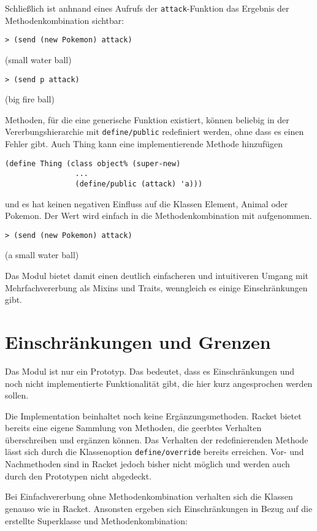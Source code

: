 Schließlich ist anhnand eines Aufrufs der \texttt{attack}-Funktion das Ergebnis der Methodenkombination sichtbar:

\begin{lstlisting}
> (send (new Pokemon) attack)
\end{lstlisting}
{\rsymbol (small water ball)}

\begin{lstlisting}
> (send p attack)
\end{lstlisting}
{\rsymbol (big fire ball)}

Methoden, für die eine generische Funktion existiert, können beliebig in der Vererbungshierarchie mit \texttt{define/public} redefiniert werden, ohne dass es einen Fehler gibt. Auch Thing kann eine implementierende Methode hinzufügen

\begin{lstlisting}
(define Thing (class object% (super-new)
                ...
                (define/public (attack) 'a)))
\end{lstlisting}

und es hat keinen negativen Einfluss auf die Klassen Element, Animal oder Pokemon. Der Wert wird einfach in die Methodenkombination mit aufgenommen.

\begin{lstlisting}
> (send (new Pokemon) attack)
\end{lstlisting}
{\rsymbol (a small water ball)}

Das Modul bietet damit einen deutlich einfacheren und intuitiveren Umgang mit Mehrfachvererbung als Mixins und Traits, wenngleich es einige Einschränkungen gibt.

\section{Einschränkungen und Grenzen}
Das Modul ist nur ein Prototyp. Das bedeutet, dass es  Einschränkungen und noch nicht implementierte Funktionalität gibt, die hier kurz angesprochen werden sollen.

Die Implementation beinhaltet noch keine Ergänzungsmethoden. Racket bietet bereits eine eigene Sammlung von Methoden, die geerbtes Verhalten überschreiben und ergänzen können. Das Verhalten der redefinierenden Methode lässt sich durch die Klassenoption \texttt{define/override} bereits erreichen. Vor- und Nachmethoden sind in Racket jedoch bisher nicht möglich und werden auch durch den Prototypen nicht abgedeckt.

Bei Einfachvererbung ohne Methodenkombination verhalten sich die Klassen genauso wie in Racket. Ansonsten ergeben sich Einschränkungen in Bezug auf die erstellte Superklasse und Methodenkombination:

